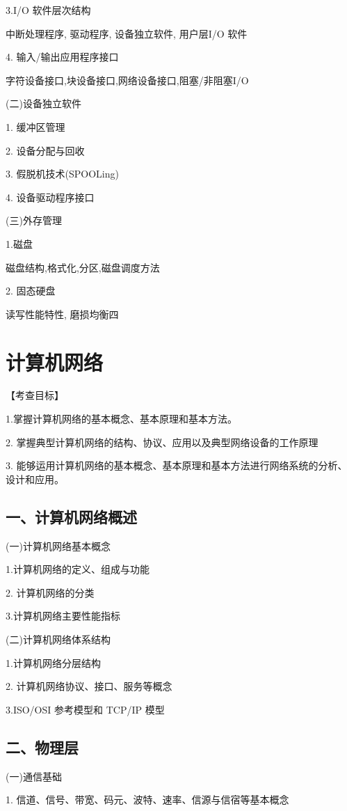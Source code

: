 \documentclass[10pt]{article}
\begin{document}
3.I/O 软件层次结构

中断处理程序, 驱动程序, 设备独立软件, 用户层I/O 软件

4. 输入/输出应用程序接口

字符设备接口,块设备接口,网络设备接口,阻塞/非阻塞I/O

(二)设备独立软件

1. 缓冲区管理

2. 设备分配与回收

3. 假脱机技术(SPOOLing)

4. 设备驱动程序接口

(三)外存管理

1.磁盘

磁盘结构,格式化,分区,磁盘调度方法

2. 固态硬盘

读写性能特性, 磨损均衡四

\section*{计算机网络 }

【考查目标】 

1.掌握计算机网络的基本概念、基本原理和基本方法。 

2. 掌握典型计算机网络的结构、协议、应用以及典型网络设备的工作原理 

3. 能够运用计算机网络的基本概念、基本原理和基本方法进行网络系统的分析、设计和应用。

\subsection*{一、计算机网络概述}

(一)计算机网络基本概念

1.计算机网络的定义、组成与功能

2. 计算机网络的分类

3.计算机网络主要性能指标

(二)计算机网络体系结构

1.计算机网络分层结构

2. 计算机网络协议、接口、服务等概念

3.ISO/OSI 参考模型和 TCP/IP 模型

\subsection*{二、物理层}

(一)通信基础

1. 信道、信号、带宽、码元、波特、速率、信源与信宿等基本概念
\end{document}
